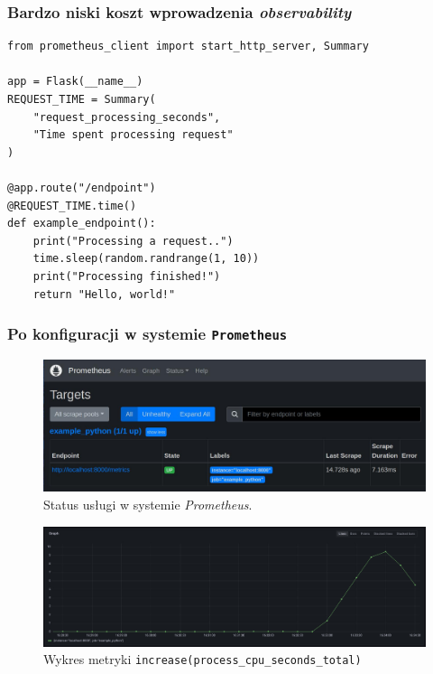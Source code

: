 \documentclass[]{beamer}
\begin{document}
\begin{frame}[fragile]
  \frametitle{Bardzo niski koszt wprowadzenia \textit{observability}}

  \vspace{-0.2cm}
  \begin{verbatim}
from prometheus_client import start_http_server, Summary

app = Flask(__name__)
REQUEST_TIME = Summary(
    "request_processing_seconds",
    "Time spent processing request"
)

@app.route("/endpoint")
@REQUEST_TIME.time()
def example_endpoint():
    print("Processing a request..")
    time.sleep(random.randrange(1, 10))
    print("Processing finished!")
    return "Hello, world!"
  \end{verbatim}
\end{frame}

\begin{frame}
  \frametitle{Po konfiguracji w systemie \texttt{Prometheus}}

  \begin{figure}
    \centering
    \includegraphics[width=0.7\linewidth]{prometheus_scrape_example.jpg}
    \caption{Status usługi w systemie \textit{Prometheus}.}
  \end{figure}

  \vspace{-0.5cm}

  \begin{figure}
    \centering
    \includegraphics[width=0.7\linewidth]{grafana_example_python_monitoring.jpg}
    \caption{Wykres metryki \texttt{increase(process\_cpu\_seconds\_total)}}
  \end{figure}
\end{frame}
\end{document}
